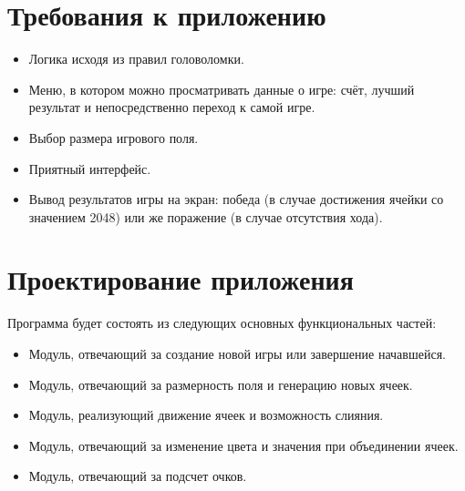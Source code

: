 \documentclass[a4paper,12pt]{article}
\begin{document}
\section{Требования к приложению}
\begin{itemize}
    \item Логика исходя из правил головоломки. 
    \item Меню, в котором можно просматривать данные о игре: счёт, лучший результат и непосредственно переход к самой игре.
    \item Выбор размера игрового поля.
    \item Приятный интерфейс.
    \item Вывод результатов игры на экран: победа (в случае достижения ячейки со значением 2048) или же поражение (в случае отсутствия хода).
    
\end{itemize}


\newpage

\section{Проектирование приложения}
Программа будет состоять из следующих основных функциональных частей:
\begin{itemize}
    \item Модуль, отвечающий за создание новой игры или завершение начавшейся.
    \item Модуль, отвечающий за размерность поля и генерацию новых ячеек.
    \item Модуль, реализующий движение ячеек и возможность слияния.
    \item Модуль, отвечающий за изменение цвета и значения при объединении ячеек.
    \item Модуль, отвечающий за подсчет очков.
\end{itemize}


\newpage

\end{document}
